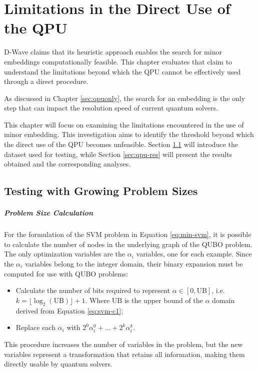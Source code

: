 \chapter{Limitations in the Direct Use of the QPU}

D-Wave claims that its heuristic approach enables the search for minor embeddings computationally feasible. 
This chapter evaluates that claim to understand the limitations beyond which the QPU cannot be effectively used through a direct procedure.

As discussed in Chapter \ref{sec:qpuonly}, the search for an embedding is the only step that can impact the resolution speed of current quantum solvers. 

This chapter will focus on examining the limitations encountered in the use of minor embedding. 
This investigation aims to identify the threshold beyond which the direct use of the QPU becomes unfeasible.
Section \ref{sec:qpu-dataset} will introduce the dataset used for testing, while Section \ref{sec:qpu-res} will present the results obtained and the corresponding analyses.

\section{Testing with Growing Problem Sizes}\label{sec:qpu-dataset}

\paragraph{Problem Size Calculation} For the formulation of the SVM problem in Equation \eqref{eq:min-svm}, it is possible to calculate the number of nodes in the underlying graph of the QUBO problem. 
The only optimization variables are the $\alpha_i$ variables, one for each example. 
Since the $\alpha_i$ variables belong to the integer domain, their binary expansion must be computed for use with QUBO problems:

\begin{itemize} 
	\item Calculate the number of bits required to represent $\alpha \in [0, \text{UB}]$, i.e. $k = \lfloor\log_2(\text{UB})\rfloor + 1$. Where $\text{UB}$ is the upper bound of the $\alpha$ domain derived from Equation \eqref{eq:svm-c1}; 
	\item Replace each $\alpha_i$ with $2^0\alpha_i^0 + \dots + 2^k\alpha_i^k$. 
\end{itemize}

This procedure increases the number of variables in the problem, but the new variables represent a transformation that retains all information, making them directly usable by quantum solvers.

